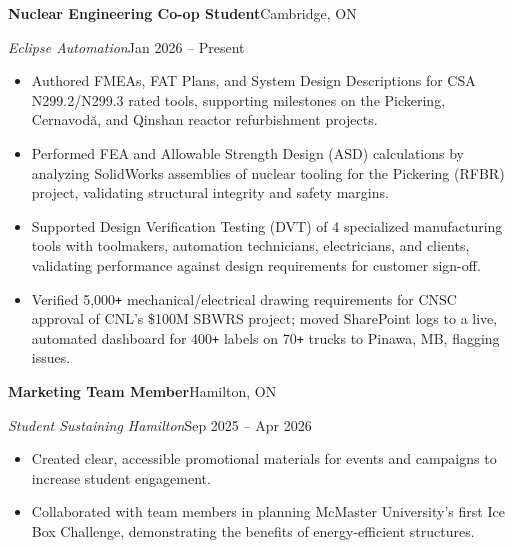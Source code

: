 \documentclass[a4paper]{article}
\begin{document}
\textbf{Nuclear Engineering Co-op Student}\hfill Cambridge, ON \par
\textit{Eclipse Automation}\hfill Jan 2026 -- Present
\vspace{1mm}
\begin{itemize}
    \item Authored FMEAs, FAT Plans, and System Design Descriptions for CSA N299.2/N299.3 rated tools, supporting milestones on the Pickering, Cernavodă, and Qinshan reactor refurbishment projects.
    \item Performed FEA and Allowable Strength Design (ASD) calculations by analyzing SolidWorks assemblies of nuclear tooling for the Pickering (RFBR) project, validating structural integrity and safety margins.

    \item Supported Design Verification Testing (DVT) of 4 specialized manufacturing tools with toolmakers, automation technicians, electricians, and clients, validating performance against design requirements for customer sign-off.
    \item Verified 5,000\texttt{+} mechanical/electrical drawing requirements for CNSC approval of CNL's \$100M SBWRS project; moved SharePoint logs to a live, automated dashboard for 400\texttt{+} labels on 70\texttt{+} trucks to Pinawa, MB, flagging issues.

\end{itemize}

\vspace{1.5mm}

\iffalse
\textbf{Marketing Team Member}\hfill Hamilton, ON \par
\textit{Student Sustaining Hamilton}\hfill Sep 2025 -- Apr 2026
\vspace{1mm}
\begin{itemize}
    \item Created clear, accessible promotional materials for events and campaigns to increase student engagement.
    \item Collaborated with team members in planning McMaster University's first Ice Box Challenge, demonstrating the benefits of energy-efficient structures.
\end{itemize}
\end{document}
